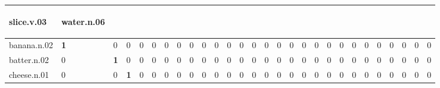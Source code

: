 \documentclass[10pt]{article}
\begin{document}
{\begin{tabular}{|l|l|l|l|l|l|l|l|l|l|l|l|l|l|l|l|l|l|l|l|l|l|l|l|l|l|l|l|}
\begin{turn}{90}slice.v.03\end{turn} & \begin{turn}{90}water.n.06\end{turn}\\ \hline
banana.n.02 & \cellcolor{cfmcolor!100}\textbf{1} & \cellcolor{cfmcolor!0}0 & \cellcolor{cfmcolor!0}0 & \cellcolor{cfmcolor!0}0 & \cellcolor{cfmcolor!0}0 & \cellcolor{cfmcolor!0}0 & \cellcolor{cfmcolor!0}0 & \cellcolor{cfmcolor!0}0 & \cellcolor{cfmcolor!0}0 & \cellcolor{cfmcolor!0}0 & \cellcolor{cfmcolor!0}0 & \cellcolor{cfmcolor!0}0 & \cellcolor{cfmcolor!0}0 & \cellcolor{cfmcolor!0}0 & \cellcolor{cfmcolor!0}0 & \cellcolor{cfmcolor!0}0 & \cellcolor{cfmcolor!0}0 & \cellcolor{cfmcolor!0}0 & \cellcolor{cfmcolor!0}0 & \cellcolor{cfmcolor!0}0 & \cellcolor{cfmcolor!0}0 & \cellcolor{cfmcolor!0}0 & \cellcolor{cfmcolor!0}0 & \cellcolor{cfmcolor!0}0 & \cellcolor{cfmcolor!0}0 & \cellcolor{cfmcolor!0}0 & \cellcolor{cfmcolor!0}0\\ \hline
batter.n.02 & \cellcolor{cfmcolor!0}0 & \cellcolor{cfmcolor!100}\textbf{1} & \cellcolor{cfmcolor!0}0 & \cellcolor{cfmcolor!0}0 & \cellcolor{cfmcolor!0}0 & \cellcolor{cfmcolor!0}0 & \cellcolor{cfmcolor!0}0 & \cellcolor{cfmcolor!0}0 & \cellcolor{cfmcolor!0}0 & \cellcolor{cfmcolor!0}0 & \cellcolor{cfmcolor!0}0 & \cellcolor{cfmcolor!0}0 & \cellcolor{cfmcolor!0}0 & \cellcolor{cfmcolor!0}0 & \cellcolor{cfmcolor!0}0 & \cellcolor{cfmcolor!0}0 & \cellcolor{cfmcolor!0}0 & \cellcolor{cfmcolor!0}0 & \cellcolor{cfmcolor!0}0 & \cellcolor{cfmcolor!0}0 & \cellcolor{cfmcolor!0}0 & \cellcolor{cfmcolor!0}0 & \cellcolor{cfmcolor!0}0 & \cellcolor{cfmcolor!0}0 & \cellcolor{cfmcolor!0}0 & \cellcolor{cfmcolor!0}0 & \cellcolor{cfmcolor!0}0\\ \hline
cheese.n.01 & \cellcolor{cfmcolor!0}0 & \cellcolor{cfmcolor!0}0 & \cellcolor{cfmcolor!100}\textbf{1} & \cellcolor{cfmcolor!0}0 & \cellcolor{cfmcolor!0}0 & \cellcolor{cfmcolor!0}0 & \cellcolor{cfmcolor!0}0 & \cellcolor{cfmcolor!0}0 & \cellcolor{cfmcolor!0}0 & \cellcolor{cfmcolor!0}0 & \cellcolor{cfmcolor!0}0 & \cellcolor{cfmcolor!0}0 & \cellcolor{cfmcolor!0}0 & \cellcolor{cfmcolor!0}0 & \cellcolor{cfmcolor!0}0 & \cellcolor{cfmcolor!0}0 & \cellcolor{cfmcolor!0}0 & \cellcolor{cfmcolor!0}0 & \cellcolor{cfmcolor!0}0 & \cellcolor{cfmcolor!0}0 & \cellcolor{cfmcolor!0}0 & \cellcolor{cfmcolor!0}0 & \cellcolor{cfmcolor!0}0 & \cellcolor{cfmcolor!0}0 & \cellcolor{cfmcolor!0}0 & \cellcolor{cfmcolor!0}0 & \cellcolor{cfmcolor!0}0\\ \hline

\end{tabular}}
\end{document}
